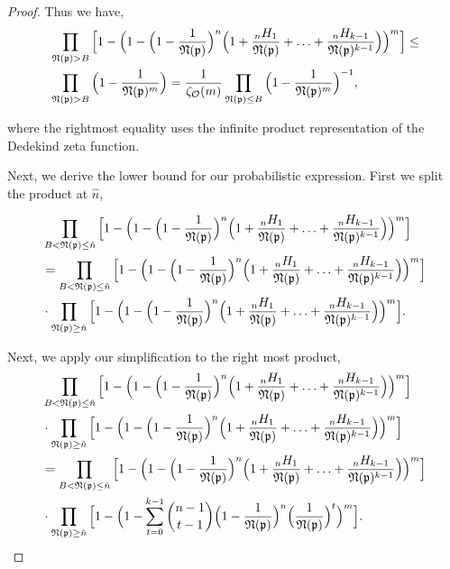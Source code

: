 \documentclass[10pt,a4paper]{article}
\newcommand{\f}[1]{\mathfrak{#1}}
\begin{document}
\begin{proof}
		Thus we have,
		\begin{align*}
			&\prod_{\f{N}(\f{p})>B} \Big[1 - \Big(1 -\Big(1-\frac{1}{\f{N}(\f{p})}\Big)^n\Big(1+\frac{{}_nH_1}{\f{N}(\f{p})}+\mathellipsis+\frac{{}_nH_{k-1}}{\f{N}(\f{p})^{k-1}}\Big)\Big)^m\Big] \leq \\
			&\prod_{\f{N}(\f{p})>B} \Big(1 - \frac{1}{\f{N}(\f{p})^m}\Big) = \frac{1}{\zeta_\mathcal{O}(m)} \prod_{\f{N}(\f{p})\leq B} \Big(1 - \frac{1}{\f{N}(\f{p})^m}\Big)^{-1},
		\end{align*}
		
		where the rightmost equality uses the infinite product representation of the Dedekind zeta function.
		
		\vspace{.1 in}
		
		Next, we derive the lower bound for our probabilistic expression. First we split the product at $\hat{n}$,
		
		\begin{align*}
			&\prod_{B<\f{N}(\f{p})\leq\hat{n}} \Big[1 - \Big(1 -\Big(1-\frac{1}{\f{N}(\f{p})}\Big)^n\Big(1+\frac{{}_nH_1}{\f{N}(\f{p})}+\mathellipsis+\frac{{}_nH_{k-1}}{\f{N}(\f{p})^{k-1}}\Big)\Big)^m\Big]\\
			&=\prod_{B<\f{N}(\f{p})\leq\hat{n}} \Big[1 - \Big(1 -\Big(1-\frac{1}{\f{N}(\f{p})}\Big)^n\Big(1+\frac{{}_nH_1}{\f{N}(\f{p})}+\mathellipsis+\frac{{}_nH_{k-1}}{\f{N}(\f{p})^{k-1}}\Big)\Big)^m\Big]\\
			&\cdot\prod_{\f{N}(\f{p})\geq\hat{n}} \Big[1 - \Big(1 -\Big(1-\frac{1}{\f{N}(\f{p})}\Big)^n\Big(1+\frac{{}_nH_1}{\f{N}(\f{p})}+\mathellipsis+\frac{{}_nH_{k-1}}{\f{N}(\f{p})^{k-1}}\Big)\Big)^m\Big].\\
		\end{align*}
		
		Next, we apply our simplification to the right most product,
		\begin{align*}
			&\prod_{B<\f{N}(\f{p})\leq\hat{n}} \Big[1 - \Big(1 -\Big(1-\frac{1}{\f{N}(\f{p})}\Big)^n\Big(1+\frac{{}_nH_1}{\f{N}(\f{p})}+\mathellipsis+\frac{{}_nH_{k-1}}{\f{N}(\f{p})^{k-1}}\Big)\Big)^m\Big]\\
			&\cdot\prod_{\f{N}(\f{p})\geq\hat{n}} \Big[1 - \Big(1 -\Big(1-\frac{1}{\f{N}(\f{p})}\Big)^n\Big(1+\frac{{}_nH_1}{\f{N}(\f{p})}+\mathellipsis+\frac{{}_nH_{k-1}}{\f{N}(\f{p})^{k-1}}\Big)\Big)^m\Big]\\
			&=\prod_{B<\f{N}(\f{p})\leq\hat{n}} \Big[1 - \Big(1 -\Big(1-\frac{1}{\f{N}(\f{p})}\Big)^n\Big(1+\frac{{}_nH_1}{\f{N}(\f{p})}+\mathellipsis+\frac{{}_nH_{k-1}}{\f{N}(\f{p})^{k-1}}\Big)\Big)^m\Big]\\
			&\cdot\prod_{\f{N}(\f{p})\geq\hat{n}} \Big[1 - \Big(1 -\sum_{t=0}^{k-1}\binom{n-1}{t-1}\Big(1-\frac{1}{\f{N}(\f{p})}\Big)^n\Big(\frac{1}{\f{N}(\f{p})}\Big)^t\Big)^m\Big].
		\end{align*}
		

\end{proof}
\end{document}
